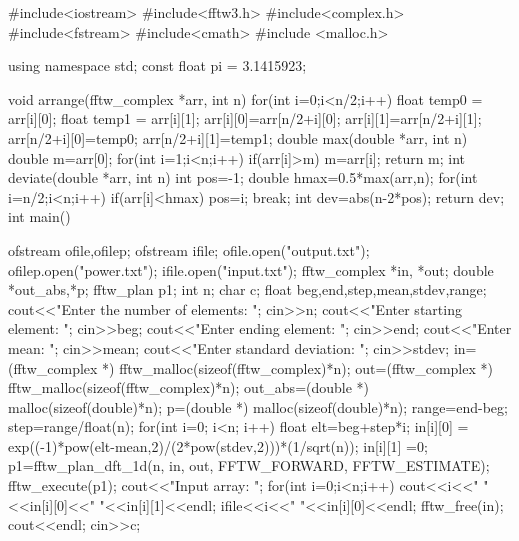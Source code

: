 \documentclass[a4,12pt,oneside]{report}
\newenvironment{sans}
	{\fontfamily{lmtt}
	 \selectfont
	 \verbatim
	 }
	 {
	 \endverbatim
	 \par
	 }
\begin{document}
        \begin{sans}
        	#include<iostream>
        	#include<fftw3.h>
        	#include<complex.h>
        	#include<fstream>
        	#include<cmath>
        	#include <malloc.h>
        	
        	using namespace std;
        	const float pi = 3.1415923;
        	
        	void arrange(fftw_complex *arr, int n)
        	{
        	for(int i=0;i<n/2;i++)
        	{
        	float temp0 = arr[i][0];
        	float temp1 = arr[i][1];
        	arr[i][0]=arr[n/2+i][0];
        	arr[i][1]=arr[n/2+i][1];
        	arr[n/2+i][0]=temp0;
        	arr[n/2+i][1]=temp1;
        	}
        	}
        	double max(double *arr, int n)
        	{
        	double m=arr[0];
        	for(int i=1;i<n;i++)
        	{
        	if(arr[i]>m)
        	{
        	m=arr[i];
        	}
        	}
        	return m;
        	}
        	int deviate(double *arr, int n)
        	{
        	int pos=-1;
        	double hmax=0.5*max(arr,n);
        	for(int i=n/2;i<n;i++)
        	{
        	if(arr[i]<hmax)
        	{
        	pos=i;
        	break;
        	}
        	}
        	int dev=abs(n-2*pos);
        	return dev;
        	}
        	int main()
        	{
        	ofstream ofile,ofilep;
        	ofstream ifile;
        	ofile.open("output.txt");
        	ofilep.open("power.txt");
        	ifile.open("input.txt");
        	fftw_complex *in, *out;
        	double *out_abs,*p;
        	fftw_plan p1;
        	int n;
        	char c;
        	float beg,end,step,mean,stdev,range;
        	cout<<"Enter the number of elements: ";
        	cin>>n;
        	cout<<"Enter starting element: ";
        	cin>>beg;
        	cout<<"Enter ending element: ";
        	cin>>end;
        	cout<<"Enter mean: ";
        	cin>>mean;
        	cout<<"Enter standard deviation: ";
        	cin>>stdev;
        	in=(fftw_complex *) fftw_malloc(sizeof(fftw_complex)*n);
        	out=(fftw_complex *) fftw_malloc(sizeof(fftw_complex)*n);
        	out_abs=(double *) malloc(sizeof(double)*n);
        	p=(double *) malloc(sizeof(double)*n);
        	range=end-beg;
        	step=range/float(n);
        	for(int i=0; i<n; i++)
        	{
        	float elt=beg+step*i;
        	in[i][0] = exp((-1)*pow(elt-mean,2)/(2*pow(stdev,2)))*(1/sqrt(n));
        	in[i][1] =0;
        	}
        	p1=fftw_plan_dft_1d(n, in, out, FFTW_FORWARD, FFTW_ESTIMATE);
        	fftw_execute(p1);
        	cout<<"Input array: ";
        	for(int i=0;i<n;i++)
        	{
        	cout<<i<<" "<<in[i][0]<<" "<<in[i][1]<<endl;
        	ifile<<i<<" "<<in[i][0]<<endl;
        	}
        	fftw_free(in);
        	cout<<endl;
        	cin>>c;
        	
}
\end{sans}
\end{document}
